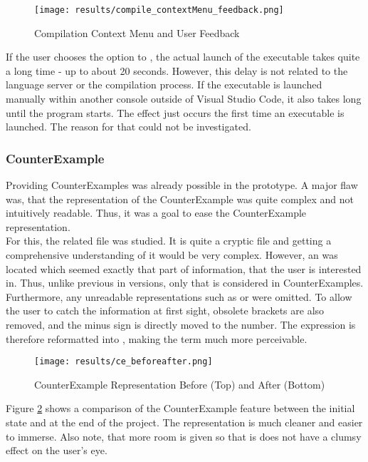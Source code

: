 \begin{figure}[H]
    \centering
    \texttt{[image: results/compile\_contextMenu\_feedback.png]}
    \caption{Compilation Context Menu and User Feedback}
    \label{fig:compilation_stuff}
\end{figure}


If the user chooses the option to , the actual launch of the executable takes quite a long time - up to about 20 seconds.
However, this delay is not related to the language server or the compilation process.
If the executable is launched manually within another console outside of Visual Studio Code, it also takes long until the program starts.
The effect just occurs the first time an executable is launched.
The reason for that could not be investigated.

\subsubsection{CounterExample}
Providing CounterExamples was already possible in the prototype.
A major flaw was, that the representation of the CounterExample was quite complex and not intuitively readable.
Thus, it was a goal to ease the CounterExample representation.\\

For this, the related  file was studied.
It is quite a  cryptic file and getting a comprehensive understanding of it would be very complex.
However, an  was located which seemed exactly that part of information, that the user is interested in.
Thus, unlike previous in versions, only that  is considered in CounterExamples.
Furthermore, any unreadable representations such as  or  were omitted.
To allow the user to catch the information at first sight, obsolete brackets are also removed, and the minus sign is directly moved to the number.
The expression  is therefore reformatted into , making the term much more perceivable.

\begin{figure}[H]
    \centering
    \texttt{[image: results/ce\_beforeafter.png]}
    \caption{CounterExample Representation Before (Top) and After (Bottom)}
    \label{fig:ce_beforeafter}
\end{figure}

Figure \ref{fig:ce_beforeafter} shows a comparison of the CounterExample feature between the initial state and at the end of the project.
The representation is much cleaner and easier to immerse. 
Also note, that more room is given so that is does not have a clumsy effect on the user's eye. \\

